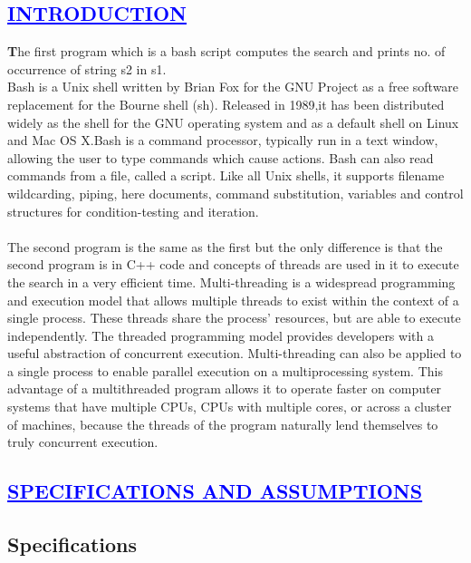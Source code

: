 \documentclass[a4paper,12pt]{report}
\begin{document}
\begin{center}
\chapter{\textcolor{blue}{\underline {INTRODUCTION}}}
\end{center}
\noindent \textbf The first program which is a bash script computes the search and prints no. of occurrence of string s2 in s1.\\

    Bash is a Unix shell written by Brian Fox for the GNU Project as a free software replacement for the Bourne shell (sh). Released in 1989,it has been 
distributed widely as the shell for the GNU operating system and as a default shell on Linux and Mac OS X.Bash is a command processor, typically run in a text window, allowing the user to type commands which cause actions. Bash can also read commands from a file, called a script. Like all Unix shells, it supports filename wildcarding, 
piping, here documents, command substitution, variables and control structures for condition-testing and iteration.\\\\
    
      The second program is the same as the first but the only difference is that the second program is in C++ code and concepts of threads are used in it to execute the search in a very efficient time.
    Multi-threading is a widespread programming and execution model that allows multiple threads to exist within the context of a single process. These threads share the process' resources, but are able to execute independently. 
    The threaded programming model provides developers with a useful abstraction of concurrent execution. Multi-threading can also be applied to a single process to enable parallel execution on a multiprocessing system.
  This advantage of a multithreaded program allows it to operate faster on computer systems that have multiple CPUs, CPUs with multiple cores, or across a cluster of machines, because the threads of the program naturally lend themselves to truly concurrent execution.
\begin{center}
\chapter{\textcolor{blue}{\underline {SPECIFICATIONS AND ASSUMPTIONS}}}
\end{center}
\section*{Specifications}
\end{document}
